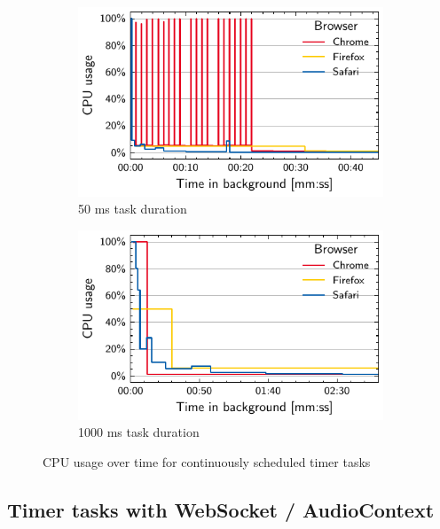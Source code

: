 \documentclass[article,type=bsc,colorback,accentcolor=tud9c]{tudthesis}
\begin{document}
  \begin{figure}
    \begin{subfigure}[t]{0.45\textwidth}
      \includegraphics[width=\textwidth]{images/timer-50.pdf}
      \caption{50 ms task duration}
    \end{subfigure}
    \hfill
    \begin{subfigure}[t]{0.45\textwidth}
      \includegraphics[width=\textwidth]{images/timer-1000.pdf}
      \caption{1000 ms task duration}
    \end{subfigure}

    \caption{CPU usage over time for continuously scheduled timer tasks}
    \label{fig:timer}
  \end{figure}

  \subsection{Timer tasks with WebSocket / AudioContext}
\end{document}
